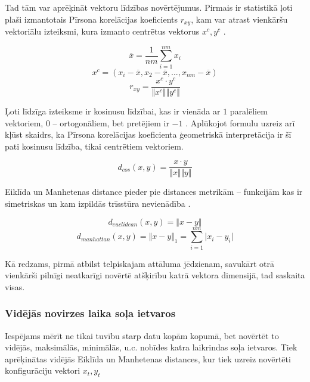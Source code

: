 \documentclass[12pt, a4paper]{article}
\numberwithin{equation}{section} %
\begin{document}
Tad tām var aprēķināt vektoru līdzības novērtējumus. Pirmais ir statistikā ļoti plaši izmantotais Pīrsona korelācijas koeficients $r_{xy}$, kam var atrast vienkāršu vektoriālu izteiksmi, kura izmanto centrētus vektorus $x^c, y^c$ \cite{pearson_vector}. 

\begin{equation}
    \overline{x} = \frac{1}{nm} \sum_{i=1}^{nm} x_i
\end{equation}
\begin{equation}
    x^c = (x_i - \overline{x}, x_2 - \overline{x}, ..., x_{nm} - \overline{x})
\end{equation}
\begin{equation}
    r_{xy} = \frac{x^c \cdot y^c}{\Vert x^c \Vert \Vert y^c \Vert}
\end{equation}

Ļoti līdzīga izteiksme ir kosinusu līdzībai, kas ir vienāda ar $1$ paralēliem vektoriem, $0$ -- ortogonāliem, bet pretējiem ir $-1$ \cite{cosine_sim}. Aplūkojot formulu uzreiz arī kļūst skaidrs, ka Pīrsona korelācijas koeficienta ģeometriskā interpretācija ir šī pati kosinusu līdzība, tikai centrētiem vektoriem.

\begin{equation}
    d_{cos}(x,y) = \frac{x \cdot y}{\Vert x \Vert \Vert y \Vert}
\end{equation}

Eiklīda un Manhetenas distance pieder pie distances metrikām -- funkcijām kas ir simetriskas un kam izpildās trīsstūra nevienādība \cite{metrics}.

\begin{equation}
    d_{euclidean}(x,y) = \Vert x - y \Vert
\end{equation}
\begin{equation}
    d_{manhattan}(x,y) = \Vert x - y \Vert_1 = \sum_{i=1}^{nm} \vert x_i - y_i \vert
\end{equation}

Kā redzams, pirmā atbilst telpiskajam attāluma jēdzienam, savukārt otrā vienkārši pilnīgi neatkarīgi novērtē atšķirību katrā vektora dimensijā, tad saskaita visas.

\subsubsection{Vidējās novirzes laika soļa ietvaros}

Iespējams mērīt ne tikai tuvību starp datu kopām kopumā, bet novērtēt to vidējās, maksimālās, minimālās, u.c. nobīdes katra laikrindas soļa ietvaros. Tiek aprēķinātas vidējās Eiklīda un Manhetenas distances, kur tiek uzreiz novērtēti konfigurāciju vektori $x_t, y_t$
\end{document}
